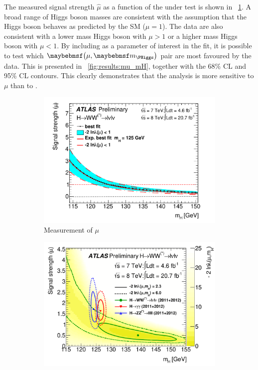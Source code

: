 The measured signal strength $\hat{\mu}$ as a function of the \mH under test is shown in 
\Figure~\ref{fig:results:mu}. A broad range of Higgs boson masses are consistent with the 
assumption that the Higgs boson behaves as predicted by the SM (\ie $\mu = 1$). The data are 
also consistent with a lower mass Higgs boson with $\mu > 1$ or a higher mass Higgs boson 
with $\mu < 1$. By including \mH as a parameter of interest in the fit, it is possible to 
test which $\parenths{\mu, \mH}$ pair are most favoured by the data. This is presented in 
\Figure~\ref{fig:results:mu_mH}, together with the 68\% CL and 95\% CL contours. This 
clearly demonstrates that the analysis is more sensitive to $\mu$ than to \mH.

\begin{figure}[t]
	\begin{subfigure}[b]{0.495\textwidth}
		\centering
		\includegraphics[width=\textwidth]{tex/results/Mor13_mu}
		\caption{Measurement of $\mu$}
		\label{fig:results:mu}
	\end{subfigure}
	\hfill
	\begin{subfigure}[b]{0.495\textwidth}
		\centering
		\includegraphics[width=\textwidth]{tex/results/Mor13_mu_mH}

\end{subfigure}
\end{figure}
